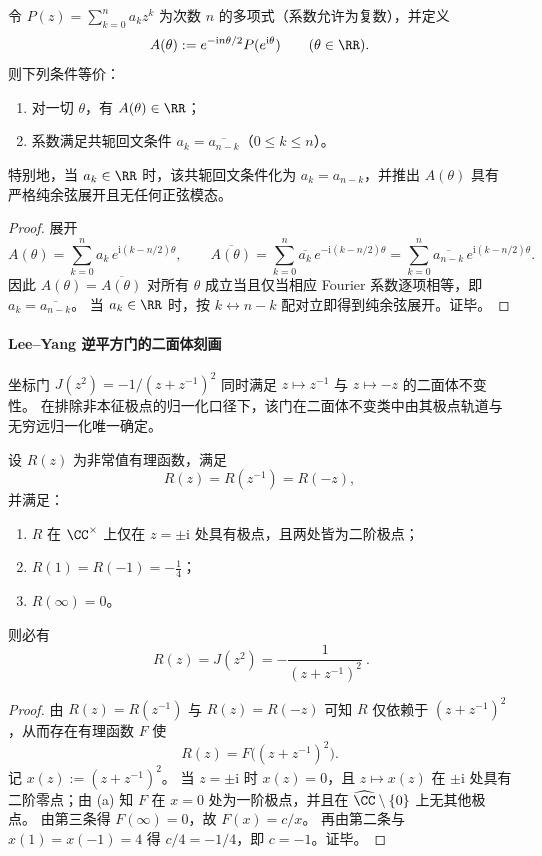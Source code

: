 \begin{lemma}[回文谱与纯余弦振幅]\label{lem:leyang-palindrome-spectrum-real-amplitude}
令 \(P(z)=\sum_{k=0}^{n}a_k z^k\) 为次数 \(n\) 的多项式（系数允许为复数），并定义
\[
A(\theta):=e^{-\mathrm{i}n\theta/2}P(e^{\mathrm{i}\theta})\qquad(\theta\in\RR).
\]
则下列条件等价：
\begin{enumerate}
  \item 对一切 \(\theta\)，有 \(A(\theta)\in\RR\)；
  \item 系数满足共轭回文条件 \(a_k=\overline{a_{n-k}}\)（\(0\le k\le n\)）。
\end{enumerate}
特别地，当 \(a_k\in\RR\) 时，该共轭回文条件化为 \(a_k=a_{n-k}\)，并推出 \(A(\theta)\) 具有严格纯余弦展开且无任何正弦模态。
\end{lemma}
\begin{proof}
展开
\[
A(\theta)=\sum_{k=0}^{n}a_k\,e^{\mathrm{i}(k-n/2)\theta},
\qquad
\overline{A(\theta)}=\sum_{k=0}^{n}\overline{a_k}\,e^{-\mathrm{i}(k-n/2)\theta}
=\sum_{k=0}^{n}\overline{a_{n-k}}\,e^{\mathrm{i}(k-n/2)\theta}.
\]
因此 \(A(\theta)=\overline{A(\theta)}\) 对所有 \(\theta\) 成立当且仅当相应 Fourier 系数逐项相等，即 \(a_k=\overline{a_{n-k}}\)。
当 \(a_k\in\RR\) 时，按 \(k\leftrightarrow n-k\) 配对立即得到纯余弦展开。证毕。
\end{proof}

\paragraph{Lee--Yang 逆平方门的二面体刻画}
坐标门 \(J(z^2)=-1/(z+z^{-1})^2\) 同时满足 \(z\mapsto z^{-1}\) 与 \(z\mapsto -z\) 的二面体不变性。
在排除非本征极点的归一化口径下，该门在二面体不变类中由其极点轨道与无穷远归一化唯一确定。

\begin{proposition}[二面体归一化下的唯一性]\label{prop:leyang-inverse-square-dihedral-uniqueness}
设 \(R(z)\) 为非常值有理函数，满足
\[
R(z)=R(z^{-1})=R(-z),
\]
并满足：
\begin{enumerate}
  \item \(R\) 在 \(\CC^{\times}\) 上仅在 \(z=\pm \mathrm{i}\) 处具有极点，且两处皆为二阶极点；
  \item \(R(1)=R(-1)=-\tfrac14\)；
  \item \(R(\infty)=0\)。
\end{enumerate}
则必有
\[
\boxed{\ R(z)=J(z^2)=-\frac{1}{(z+z^{-1})^2}\ }.
\]
\end{proposition}
\begin{proof}
由 \(R(z)=R(z^{-1})\) 与 \(R(z)=R(-z)\) 可知 \(R\) 仅依赖于 \((z+z^{-1})^2\)，从而存在有理函数 \(F\) 使
\[
R(z)=F\bigl((z+z^{-1})^2\bigr).
\]
记 \(x(z):=(z+z^{-1})^2\)。
当 \(z=\pm\mathrm{i}\) 时 \(x(z)=0\)，且 \(z\mapsto x(z)\) 在 \(\pm\mathrm{i}\) 处具有二阶零点；由 (a) 知 \(F\) 在 \(x=0\) 处为一阶极点，并且在 \(\widehat{\CC}\setminus\{0\}\) 上无其他极点。
由第三条得 \(F(\infty)=0\)，故 \(F(x)=c/x\)。
再由第二条与 \(x(1)=x(-1)=4\) 得 \(c/4=-1/4\)，即 \(c=-1\)。证毕。
\end{proof}

